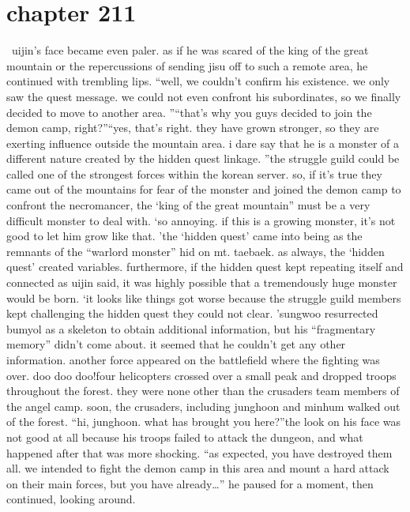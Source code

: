 \section{chapter 211}






 uijin’s face became even paler.
 as if he was scared of the king of the great mountain or the repercussions of sending jisu off to such a remote area, he continued with trembling lips.
“well, we couldn’t confirm his existence.
 we only saw the quest message.
 we could not even confront his subordinates, so we finally decided to move to another area.
”“that’s why you guys decided to join the demon camp, right?”“yes, that’s right.
 they have grown stronger, so they are exerting influence outside the mountain area.
 i dare say that he is a monster of a different nature created by the hidden quest linkage.
”the struggle guild could be called one of the strongest forces within the korean server.
 so, if it’s true they came out of the mountains for fear of the monster and joined the demon camp to confront the necromancer, the ‘king of the great mountain” must be a very difficult monster to deal with.
‘so annoying.
 if this is a growing monster, it’s not good to let him grow like that.
’the ‘hidden quest’ came into being as the remnants of the “warlord monster” hid on mt.
 taebaek.
 as always, the ‘hidden quest’ created variables.
furthermore, if the hidden quest kept repeating itself and connected as uijin said, it was highly possible that a tremendously huge monster would be born.
‘it looks like things got worse because the struggle guild members kept challenging the hidden quest they could not clear.
’sungwoo resurrected bumyol as a skeleton to obtain additional information, but his “fragmentary memory” didn’t come about.
 it seemed that he couldn’t get any other information.
another force appeared on the battlefield where the fighting was over.
doo doo doo!four helicopters crossed over a small peak and dropped troops throughout the forest.
 they were none other than the crusaders team members of the angel camp.
soon, the crusaders, including junghoon and minhum walked out of the forest.
“hi, junghoon.
 what has brought you here?”the look on his face was not good at all because his troops failed to attack the dungeon, and what happened after that was more shocking.
“as expected, you have destroyed them all.
 we intended to fight the demon camp in this area and mount a hard attack on their main forces, but you have already…”
he paused for a moment, then continued, looking around.
